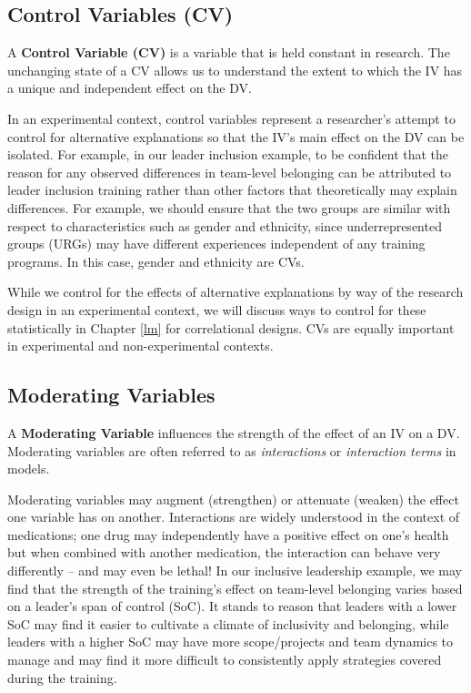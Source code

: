 \documentclass[]{book}
\begin{document}
\hypertarget{control-variables-cv}{%
\subsection{Control Variables (CV)}\label{control-variables-cv}}

A \textbf{Control Variable (CV)} is a variable that is held constant in research. The unchanging state of a CV allows us to understand the extent to which the IV has a unique and independent effect on the DV.

In an experimental context, control variables represent a researcher's attempt to control for alternative explanations so that the IV's main effect on the DV can be isolated. For example, in our leader inclusion example, to be confident that the reason for any observed differences in team-level belonging can be attributed to leader inclusion training rather than other factors that theoretically may explain differences. For example, we should ensure that the two groups are similar with respect to characteristics such as gender and ethnicity, since underrepresented groups (URGs) may have different experiences independent of any training programs. In this case, gender and ethnicity are CVs.

While we control for the effects of alternative explanations by way of the research design in an experimental context, we will discuss ways to control for these statistically in Chapter \ref{lm} for correlational designs. CVs are equally important in experimental and non-experimental contexts.

\hypertarget{moderating-variables}{%
\subsection{Moderating Variables}\label{moderating-variables}}

A \textbf{Moderating Variable} influences the strength of the effect of an IV on a DV. Moderating variables are often referred to as \emph{interactions} or \emph{interaction terms} in models.

Moderating variables may augment (strengthen) or attenuate (weaken) the effect one variable has on another. Interactions are widely understood in the context of medications; one drug may independently have a positive effect on one's health but when combined with another medication, the interaction can behave very differently -- and may even be lethal! In our inclusive leadership example, we may find that the strength of the training's effect on team-level belonging varies based on a leader's span of control (SoC). It stands to reason that leaders with a lower SoC may find it easier to cultivate a climate of inclusivity and belonging, while leaders with a higher SoC may have more scope/projects and team dynamics to manage and may find it more difficult to consistently apply strategies covered during the training.
\end{document}
